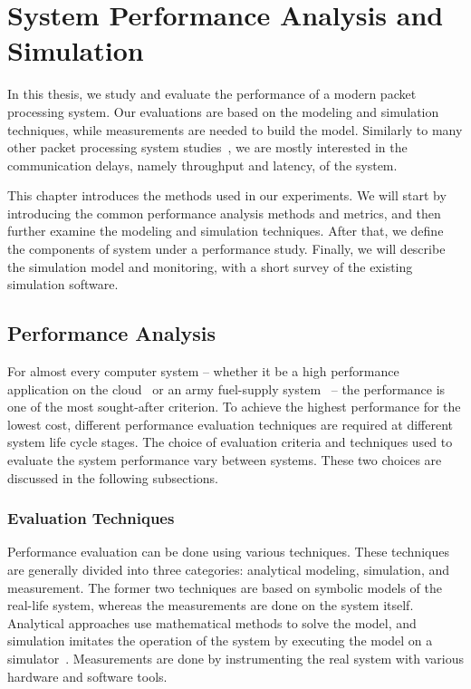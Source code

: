 \chapter{System Performance Analysis and Simulation}
\label{chapter:system-performance-analysis-and-simulation}

In this thesis, we study and evaluate the performance of a modern packet processing system. Our evaluations are based on the modeling and simulation techniques, while measurements are needed to build the model. Similarly to many other packet processing system studies~\cite{cavium:2010:fundamentals}, we are mostly interested in the communication delays, namely throughput and latency, of the system.

This chapter introduces the methods used in our experiments. We will start by introducing the common performance analysis methods and metrics, and then further examine the modeling and simulation techniques. After that, we define the components of system under a performance study. Finally, we will describe the simulation model and monitoring, with a short survey of the existing simulation software.

\section{Performance Analysis}
For almost every computer system -- whether it be a high performance application on the cloud~\cite{jackson:2010:HPCOC} or an army fuel-supply system~\cite{sabuncuoglu:2005:TAS} -- the performance is one of the most sought-after criterion. To achieve the highest performance for the lowest cost, different performance evaluation techniques are required at different system life cycle stages. The choice of evaluation criteria and techniques used to evaluate the system performance vary between systems. These two choices are discussed in the following subsections.~\cite{jain:1991:AOCSPA}

\subsection{Evaluation Techniques}
Performance evaluation can be done using various techniques. These techniques are generally divided into three categories: analytical modeling, simulation, and measurement. The former two techniques are based on symbolic models of the real-life system, whereas the measurements are done on the system itself. Analytical approaches use mathematical methods to solve the model, and simulation imitates the operation of the system by executing the model on a simulator~\cite{Banks:2010:DES}. Measurements are done by instrumenting the real system with various hardware and software tools.~\cite{jain:1991:AOCSPA}

